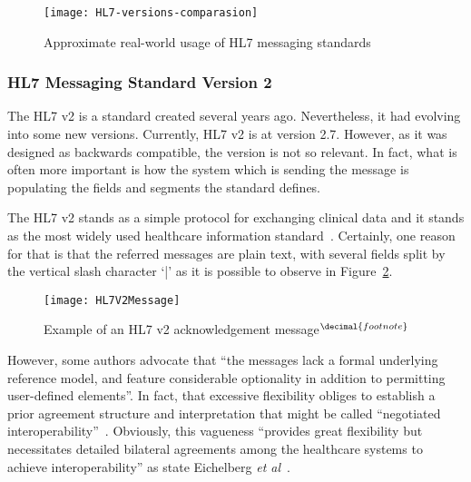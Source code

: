 \begin{figure}[t]
\centering
\texttt{[image: HL7-versions-comparasion]}
\caption[Approximate real-world usage of HL7 messaging standards]{Approximate real-world usage of HL7 messaging standards~\citep{Shaver2010}}
\label{fig:hl7-version-comparasion}
\end{figure}


\subsubsection{HL7 Messaging Standard Version 2} \label{sec:hl7-v2}

The HL7 v2 is a standard created several years ago. Nevertheless, it had evolving into some new versions. Currently, HL7 v2 is at version 2.7. However, as it was designed as backwards compatible, the version is not so relevant. In fact, what is often more important is how the system which is sending the message is populating the fields and segments the standard defines. 

The HL7 v2 stands as a simple protocol for exchanging clinical data and it stands as the most widely used healthcare information standard~\citep{Eichelberg2005}. Certainly, one reason for that is that the referred messages are plain text, with several fields split by the vertical slash character `|' as it is possible to observe in Figure~\ref{fig:hl7v2-msg}.

\addtocounter{footnote}{1}
\begin{figure}[t]
\centering
\texttt{[image: HL7V2Message]}
\caption[Example of an HL7 v2 acknowledgement message]{Example of an HL7 v2 acknowledgement message$^{\decimal{footnote}}$}
\label{fig:hl7v2-msg}
\end{figure}

However, some authors advocate that ``the messages lack a formal underlying reference model, and feature considerable optionality in addition to permitting user-defined elements''. In fact, that excessive flexibility obliges to establish a prior agreement structure and interpretation that might be called ``negotiated interoperability''~\citep{Atalag2010}. Obviously, this vagueness ``provides great flexibility but necessitates detailed bilateral agreements among the healthcare systems to achieve interoperability'' as state Eichelberg \textit{et al}~\citep{Eichelberg2005}.

